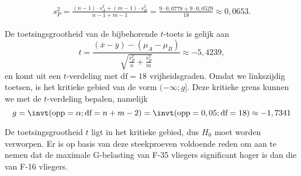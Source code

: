 \begin{enumerate}[label=(\alph*)]
{            \begin{align*}
                s_P^2 = \frac{(n-1)\cdot s_A^2 + (m-1) \cdot s_B^2}{n-1+m-1} = \frac{9\cdot 0,0778 + 9\cdot 0,0529}{18} \approx 0,0653.
            \end{align*}
            
            De toetsingsgrootheid van de bijbehorende $t$-toets is gelijk aan
            \[
                t = \frac{(\overline{x}-\overline{y}) - (\mu_A - \mu_B)}{\sqrt{\frac{s_P^2}{n} + \frac{s_P^2}{m}}} \approx -5,4239, 
            \]
            en komt uit een $t$-verdeling met $\text{df}=18$ vrijheidsgraden.
            Omdat we linkszijdig toetsen, is het kritieke gebied van de vorm $(-\infty; g]$.
            Deze kritieke grens kunnen we met de $t$-verdeling bepalen, namelijk
            \[
                g = \invt(\text{opp} = \alpha; \text{df}=n+m-2) = \invt(\text{opp}=0,05; \text{df}=18) \approx -1,7341
            \]
            
            De toetsingsgrootheid $t$ ligt in het kritieke gebied, dus $H_0$ moet worden verworpen.
            Er is op basis van deze steekproeven voldoende reden om aan te nemen dat de maximale G-belasting van F-35 vliegers significant hoger is dan die van F-16 vliegers.
        }    
        \end{enumerate}